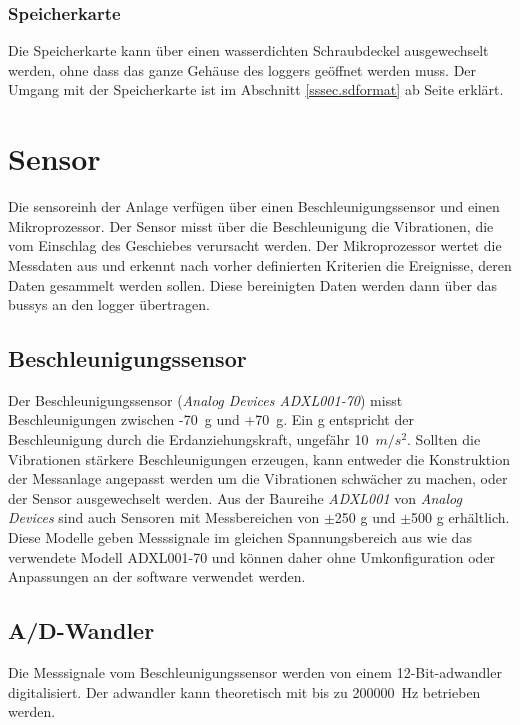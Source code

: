 \subsubsection{Speicherkarte}
Die Speicherkarte kann über einen wasserdichten Schraubdeckel ausgewechselt werden, ohne dass das ganze Gehäuse des \gls{logger}s geöffnet werden muss. Der Umgang mit der Speicherkarte ist im Abschnitt \ref{sssec.sdformat} ab Seite \pageref{sssec.sdformat} erklärt.











\section{Sensor}\label{sec.manualsensor}
Die \gls{sensoreinh} der Anlage verfügen über einen Beschleunigungssensor und einen Mikroprozessor. Der Sensor misst über die Beschleunigung die Vibrationen, die vom Einschlag des Geschiebes verursacht werden. Der Mikroprozessor wertet die Messdaten aus und erkennt nach vorher definierten Kriterien die Ereignisse, deren Daten gesammelt werden sollen. Diese bereinigten Daten werden dann über das \gls{bussys} an den \gls{logger} übertragen.

\subsection{Beschleunigungssensor}
Der Beschleunigungssensor (\emph{Analog Devices ADXL001-70}) misst Beschleunigungen zwischen -70~g und +70~g. Ein g entspricht der Beschleunigung durch die Erdanziehungskraft, ungefähr 10~\ensuremath{m/s^2}. Sollten die Vibrationen stärkere Beschleunigungen erzeugen, kann entweder die Konstruktion der Messanlage angepasst werden um die Vibrationen schwächer zu machen, oder der Sensor ausgewechselt werden. Aus der Baureihe \emph{ADXL001} von \emph{Analog Devices} sind auch Sensoren mit Messbereichen von \ensuremath{\pm}250 g und \ensuremath{\pm}500 g erhältlich. Diese Modelle geben Messsignale im gleichen Spannungsbereich aus wie das verwendete Modell ADXL001-70 und können daher ohne Umkonfiguration oder Anpassungen an der \gls{software} verwendet werden.

\subsection{A/D-Wandler}
Die Messsignale vom Beschleunigungssensor werden von einem 12-Bit-\gls{adwandler} digitalisiert. Der \gls{adwandler} kann theoretisch mit bis zu 200000~Hz betrieben werden.



